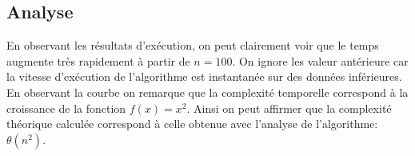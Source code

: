 \documentclass[a4paper, 12pt]{article}
\begin{document}
\subsection{Analyse}
En observant les résultats d’exécution, on peut clairement voir que le temps augmente très rapidement à partir de $n=100$. On ignore les valeur antérieure car la vitesse d’exécution de l'algorithme est instantanée sur des données inférieures. En observant la courbe on remarque que la complexité temporelle correspond à la croissance de la fonction $f(x) = x^2$. Ainsi on peut affirmer que la complexité théorique calculée correspond à celle obtenue avec l'analyse de l'algorithme: $\theta (n^2)$.
\end{document}
